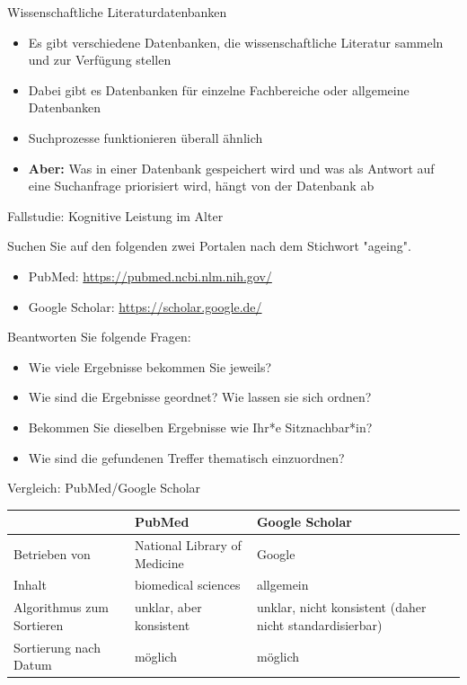 \documentclass{beamer}
\begin{document}
\begin{frame}{Wissenschaftliche Literaturdatenbanken}

\begin{itemize}
    \item 
    Es gibt verschiedene Datenbanken, die wissenschaftliche Literatur sammeln und zur Verfügung stellen
    \item 
    Dabei gibt es Datenbanken für einzelne Fachbereiche oder allgemeine Datenbanken
    \item 
    Suchprozesse funktionieren überall ähnlich
    \item 
    \textbf{Aber:} Was in einer Datenbank gespeichert wird und was als Antwort auf eine Suchanfrage priorisiert wird, hängt von der Datenbank ab
\end{itemize}
    
\end{frame}


\begin{frame}{Fallstudie: Kognitive Leistung im Alter}

Suchen Sie auf den folgenden zwei Portalen nach dem Stichwort "ageing".

\begin{itemize}
    \item 
PubMed: \url{https://pubmed.ncbi.nlm.nih.gov/}
\item 
Google Scholar: \url{https://scholar.google.de/}
\end{itemize}


Beantworten Sie folgende Fragen:

\begin{itemize}
    \item 
    Wie viele Ergebnisse bekommen Sie jeweils?
    \item 
    Wie sind die Ergebnisse geordnet? Wie lassen sie sich ordnen?
    \item 
    Bekommen Sie dieselben Ergebnisse wie Ihr*e Sitznachbar*in?
    \item 
    Wie sind die gefundenen Treffer thematisch einzuordnen?
\end{itemize}

\end{frame}

\begin{frame}{Vergleich: PubMed/Google Scholar}

\begin{tabular}{|p{3cm}|p{4cm}|p{4cm}|}
\hline
                & \textbf{PubMed}                       & \textbf{Google Scholar} \\
\hline
Betrieben von   & National Library of Medicine  & Google \\
\hline
Inhalt          & biomedical sciences    & allgemein \\
\hline
Algorithmus zum Sortieren   & unklar, aber konsistent   & unklar, nicht konsistent (daher nicht standardisierbar) \\
\hline
Sortierung nach Datum       & möglich                   & möglich \\
\hline
\end{tabular}


\end{frame}
\end{document}
